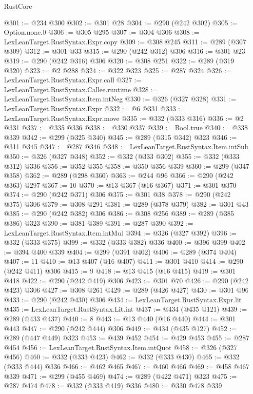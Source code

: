 \begin{lexlean}{RustCore}
\begin{coremodule}
@301 := @234 @300
@302 := @301 @28
@304 := @290 (@242 @302)
@305 := Option.none.{0}
@306 := @305 @295
@307 := @304 @306
@308 := LexLeanTarget.RustSyntax.Expr.copy
@309 := @308 @245
@311 := @289 (@307 @309)
@312 := @301 @33
@315 := @290 (@242 @312) @306
@316 := @301 @23
@319 := @290 (@242 @316) @306
@320 := @308 @251
@322 := @289 (@319 @320)
@323 := @2 @288
@324 := @322 @323
@325 := @287 @324
@326 := LexLeanTarget.RustSyntax.Expr.call
@327 := LexLeanTarget.RustSyntax.Callee.runtime
@328 := LexLeanTarget.RustSyntax.Item.intNeg
@330 := @326 (@327 @328)
@331 := LexLeanTarget.RustSyntax.Expr
@332 := @6 @331
@333 := LexLeanTarget.RustSyntax.Expr.move
@335 := @332 (@333 @316)
@336 := @2 @331
@337 := @335 @336
@338 := @330 @337
@339 := Bool.true
@340 := @338 @339
@342 := @299 (@325 @340)
@345 := @289 (@315 @342) @323
@346 := @311 @345
@347 := @287 @346
@348 := LexLeanTarget.RustSyntax.Item.intSub
@350 := @326 (@327 @348)
@352 := @332 (@333 @302)
@355 := @332 (@333 @312) @336
@356 := @352 @355
@358 := @350 @356 @339
@360 := @299 (@347 @358)
@362 := @289 (@298 @360)
@363 := @244 @96
@366 := @290 (@242 @363) @297
@367 := 10
@370 := @13 @367 (@16 @367)
@371 := @301 @370
@374 := @290 (@242 @371) @306
@375 := @301 @38
@378 := @290 (@242 @375) @306
@379 := @308 @291
@381 := @289 (@378 @379)
@382 := @301 @43
@385 := @290 (@242 @382) @306
@386 := @308 @256
@389 := @289 (@385 @386) @323
@390 := @381 @389
@391 := @287 @390
@392 := LexLeanTarget.RustSyntax.Item.intMul
@394 := @326 (@327 @392)
@396 := @332 (@333 @375)
@399 := @332 (@333 @382) @336
@400 := @396 @399
@402 := @394 @400 @339
@404 := @299 (@391 @402)
@406 := @289 (@374 @404)
@407 := 11
@410 := @13 @407 (@16 @407)
@411 := @301 @410
@414 := @290 (@242 @411) @306
@415 := 9
@418 := @13 @415 (@16 @415)
@419 := @301 @418
@422 := @290 (@242 @419) @306
@423 := @301 @70
@426 := @290 (@242 @423) @306
@427 := @308 @261
@429 := @289 (@426 @427)
@430 := @301 @96
@433 := @290 (@242 @430) @306
@434 := LexLeanTarget.RustSyntax.Expr.lit
@435 := LexLeanTarget.RustSyntax.Lit.int
@437 := @434 (@435 @121)
@439 := @289 (@433 @437)
@440 := 8
@443 := @13 @440 (@16 @440)
@444 := @301 @443
@447 := @290 (@242 @444) @306
@449 := @434 (@435 @127)
@452 := @289 (@447 @449) @323
@453 := @439 @452
@454 := @429 @453
@455 := @287 @454
@456 := LexLeanTarget.RustSyntax.Item.intQuot
@458 := @326 (@327 @456)
@460 := @332 (@333 @423)
@462 := @332 (@333 @430)
@465 := @332 (@333 @444) @336
@466 := @462 @465
@467 := @460 @466
@469 := @458 @467 @339
@471 := @299 (@455 @469)
@474 := @289 (@422 @471) @323
@475 := @287 @474
@478 := @332 (@333 @419) @336
@480 := @330 @478 @339

\end{coremodule}
\end{lexlean}
